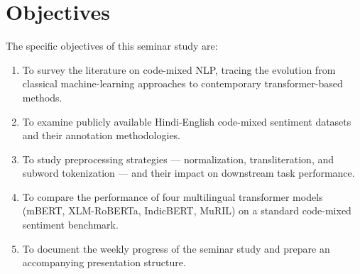 \section{Objectives}

The specific objectives of this seminar study are:

\begin{enumerate}[nosep,itemsep=3pt]
  \item To survey the literature on code-mixed NLP, tracing the evolution from classical machine-learning approaches to contemporary transformer-based methods.
  \item To examine publicly available Hindi-English code-mixed sentiment datasets and their annotation methodologies.
  \item To study preprocessing strategies — normalization, transliteration, and subword tokenization — and their impact on downstream task performance.
  \item To compare the performance of four multilingual transformer models (mBERT, XLM-RoBERTa, IndicBERT, MuRIL) on a standard code-mixed sentiment benchmark.
  \item To document the weekly progress of the seminar study and prepare an accompanying presentation structure.
\end{enumerate}
